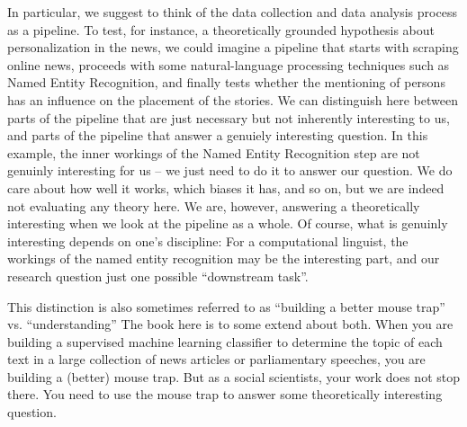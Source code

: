 In particular, we suggest to think of the data collection and data
analysis process as a pipeline. To test, for instance, a theoretically
grounded hypothesis about personalization in the news, we could
imagine a pipeline that starts with scraping online news, proceeds
with some natural-language processing techniques such as Named Entity
Recognition, and finally tests whether the mentioning of persons has
an influence on the placement of the stories. We can distinguish here
between parts of the pipeline that are just necessary but not
inherently interesting to us, and parts of the pipeline that answer a
genuiely interesting question. In this example, the inner workings of
the Named Entity Recognition step are not genuinly interesting for us
-- we just need to do it to answer our question. We do care about how
well it works, which biases it has, and so on, but we are indeed not
evaluating any theory here. We are, however, answering a theoretically
interesting when we look at the pipeline as a whole.  Of course, what
is genuinly interesting depends on one's discipline: For a
computational linguist, the workings of the named entity recognition
may be the interesting part, and our research question just one
possible ``downstream task''.

This distinction is also sometimes referred to as ``building a better
mouse trap'' vs. ``understanding'' 
The book here is to some extend about both. When you are building a supervised machine learning classifier to determine the topic of each text in a large collection of news articles or parliamentary speeches, you are building a (better) mouse trap. But as a social scientists, your work does not stop there. You need to use the mouse trap to answer some theoretically interesting question.



